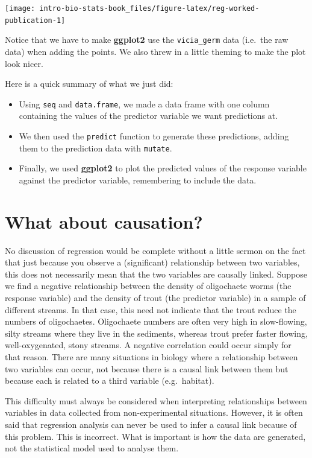 \documentclass[
]{book}
\providecommand{\tightlist}{%
  \setlength{\itemsep}{0pt}\setlength{\parskip}{0pt}}
\begin{document}
\begin{center}\texttt{[image: intro-bio-stats-book\_files/figure-latex/reg-worked-publication-1]} \end{center}

Notice that we have to make \textbf{ggplot2} use the \texttt{vicia\_germ} data (i.e.~the raw data) when adding the points. We also threw in a little theming to make the plot look nicer.

Here is a quick summary of what we just did:

\begin{itemize}
\tightlist
\item
  Using \texttt{seq} and \texttt{data.frame}, we made a data frame with one column containing the values of the predictor variable we want predictions at.
\item
  We then used the \texttt{predict} function to generate these predictions, adding them to the prediction data with \texttt{mutate}.
\item
  Finally, we used \textbf{ggplot2} to plot the predicted values of the response variable against the predictor variable, remembering to include the data.
\end{itemize}

\hypertarget{regression-causation}{%
\section{What about causation?}\label{regression-causation}}

No discussion of regression would be complete without a little sermon on the fact that just because you observe a (significant) relationship between two variables, this does not necessarily mean that the two variables are causally linked. Suppose we find a negative relationship between the density of oligochaete worms (the response variable) and the density of trout (the predictor variable) in a sample of different streams. In that case, this need not indicate that the trout reduce the numbers of oligochaetes. Oligochaete numbers are often very high in slow-flowing, silty streams where they live in the sediments, whereas trout prefer faster flowing, well-oxygenated, stony streams. A negative correlation could occur simply for that reason. There are many situations in biology where a relationship between two variables can occur, not because there is a causal link between them but because each is related to a third variable (e.g.~habitat).

This difficulty must always be considered when interpreting relationships between variables in data collected from non-experimental situations. However, it is often said that regression analysis can never be used to infer a causal link because of this problem. This is incorrect. What is important is how the data are generated, not the statistical model used to analyse them.
\end{document}
